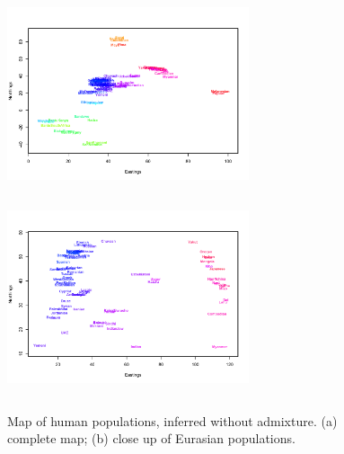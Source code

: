\documentclass[12pt]{article}
\begin{document}
\begin{figure}
	\centering
			{\includegraphics[width=2.8in,height=2.3in]{figs/globetrotter/globe_NoAd_map.png}}
			{\includegraphics[width=2.8in,height=2.3in]{figs/globetrotter/globe_Eurasia_NoAd_map_indproc.png}}
	\caption{Map of human populations, inferred without admixture. (a) complete map; (b) close up of Eurasian 
populations.}\label{sfig:globe_noad_maps}
\end{figure}
\end{document}
